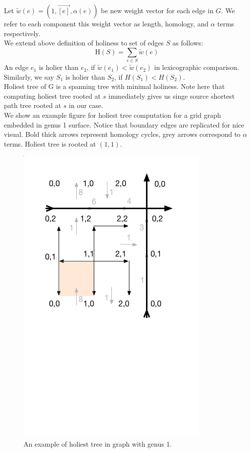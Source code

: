 \documentclass{article}
\begin{document}
Let $\tilde w(e) = ( 1, \vec{[e]}, \alpha(e) )$ be new
weight vector for each edge in $G$. We refer to each component this weight vector
as length, homology, and $\alpha$ terms respectively. \\

We extend above definition of holiness to set of edges $S$ as follows:
\[\text{H}(S) = \sum \limits_{e \in S} \tilde w(e)\]
An edge $e_1$ is holier than $e_2$, 
if $\tilde w(e_1) < \tilde w(e_2)$ in lexicographic comparison. 
Similarly, we say $S_1$ is holier than $S_2$, if $H(S_1) < H(S_2)$. \\

Holiest tree of G is a spanning tree with minimal holiness. Note here that computing holiest tree rooted at $s$ immediately gives us singe
source shortest path tree rooted at $s$ in our case. \\

We show an example figure for holiest tree computation for a grid graph 
embedded in genus 1 surface. Notice that boundary edges are replicated for nice 
visual. Bold thick arrows represent homology cycles, grey arrows correspond to 
$\alpha$ terms. Holiest tree is rooted at $(1, 1)$. 

\begin{figure}[H]
  \label{fig: g1}
  \centering
  \includegraphics[scale = 0.55]{figures/g1.jpg}
  \vspace{-3.5cm} %
  \caption{An example of holiest tree in graph with genus 1.}
\end{figure}
\end{document}
